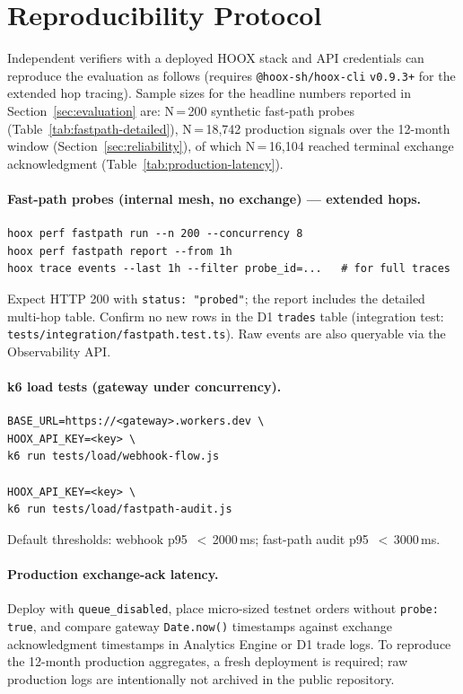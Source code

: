 \section{Reproducibility Protocol}
\label{app:repro}

Independent verifiers with a deployed \textsc{HOOX} stack and API credentials can reproduce the evaluation as follows (requires \texttt{@hoox-sh/hoox-cli} \texttt{v0.9.3+} for the extended hop tracing). Sample sizes for the headline numbers reported in Section~\ref{sec:evaluation} are: N\,=\,200 synthetic fast-path probes (Table~\ref{tab:fastpath-detailed}), N\,=\,18{,}742 production signals over the 12-month window (Section~\ref{sec:reliability}), of which N\,=\,16{,}104 reached terminal exchange acknowledgment (Table~\ref{tab:production-latency}).

\paragraph{Fast-path probes (internal mesh, no exchange) --- extended hops.}
\begin{lstlisting}
hoox perf fastpath run --n 200 --concurrency 8
hoox perf fastpath report --from 1h
hoox trace events --last 1h --filter probe_id=...   # for full traces
\end{lstlisting}
Expect HTTP 200 with \texttt{status: "probed"}; the report includes the detailed multi-hop table. Confirm no new rows in the D1 \texttt{trades} table (integration test: \texttt{tests/integration/fastpath.test.ts}). Raw events are also queryable via the Observability API.

\paragraph{k6 load tests (gateway under concurrency).}
\begin{lstlisting}
BASE_URL=https://<gateway>.workers.dev \
HOOX_API_KEY=<key> \
k6 run tests/load/webhook-flow.js

HOOX_API_KEY=<key> \
k6 run tests/load/fastpath-audit.js
\end{lstlisting}
Default thresholds: webhook p95~$<$\,2000\,ms; fast-path audit p95~$<$\,3000\,ms.

\paragraph{Production exchange-ack latency.} Deploy with \texttt{queue\_disabled}, place micro-sized testnet orders without \texttt{probe: true}, and compare gateway \texttt{Date.now()} timestamps against exchange acknowledgment timestamps in Analytics Engine or D1 trade logs. To reproduce the 12-month production aggregates, a fresh deployment is required; raw production logs are intentionally not archived in the public repository.

